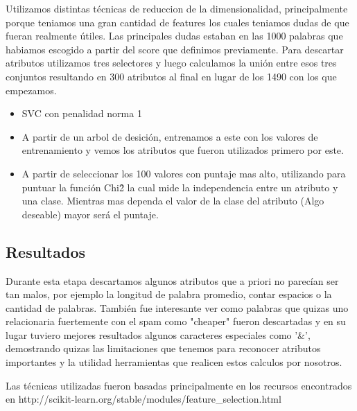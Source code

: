 Utilizamos distintas técnicas de reduccion de la dimensionalidad, principalmente porque teniamos una gran cantidad de features los cuales teniamos dudas de que fueran realmente útiles. Las principales dudas estaban en las 1000 palabras que habiamos escogido a partir del score que definimos previamente. Para descartar atributos utilizamos tres selectores y luego calculamos la unión entre esos tres conjuntos resultando en 300 atributos al final en lugar de los 1490 con los que empezamos.
\begin{itemize}

\item SVC con penalidad norma 1

\item A partir de un arbol de desición, entrenamos a este con los valores de entrenamiento y vemos los atributos que fueron utilizados primero por este.

\item A partir de seleccionar los 100 valores con puntaje mas alto, utilizando para puntuar la función Chi\^2 la cual mide la independencia entre un atributo y una clase. Mientras mas dependa el valor de la clase del atributo (Algo deseable) mayor será el puntaje.

\end{itemize}

\subsection{Resultados}

Durante esta etapa descartamos algunos atributos que a priori no parecían ser tan malos, por ejemplo la longitud de palabra promedio, contar espacios o la cantidad de palabras. También fue interesante ver como palabras que quizas uno relacionaria fuertemente con el spam como "cheaper" fueron descartadas y en su lugar tuviero mejores resultados algunos caracteres especiales como '&', demostrando quizas las limitaciones que tenemos para reconocer atributos importantes y la utilidad herramientas que realicen estos calculos por nosotros.

Las técnicas utilizadas fueron basadas principalmente en los recursos encontrados en http://scikit-learn.org/stable/modules/feature_selection.html